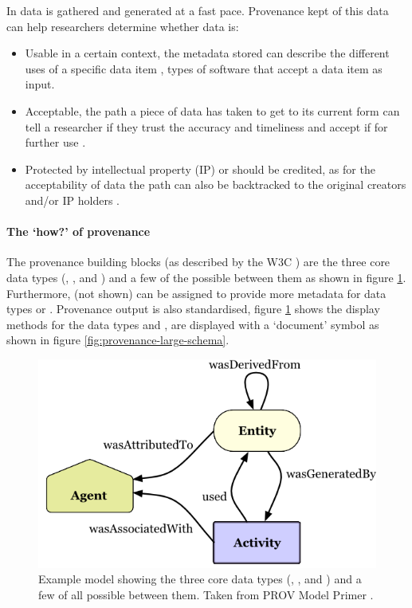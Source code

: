 In \escience{} data is gathered and generated at a fast pace.
Provenance kept of this data can help researchers determine whether data is:

\begin{itemize}
	\item Usable in a certain context, the metadata stored can describe the different uses of a specific data item \cite{dsp1simmhan}, \eg{} types of software that accept a data item as input.
	\item Acceptable, the path a piece of data has taken to get to its current form can tell a researcher if they trust the accuracy and timeliness and accept if for further use \cite{dsp1simmhan,dsp3buneman}.
	\item Protected by intellectual property (IP) or should be credited, as for the acceptability of data the path can also be backtracked to the original creators and/or IP holders \cite{dsp1simmhan}.
\end{itemize}

\paragraph{The `how?' of provenance}
\label{provenance-how}

The provenance building blocks (as described by the W3C \cite{dsp8gil}) are the three core data types (\agent{}, \entity{}, and \activity{}) and a few of the possible \relations{} between them as shown in figure \ref{fig:provenance-overview}.
Furthermore, \attributes{} (not shown) can be assigned to provide more metadata for data types or \relations{}.
Provenance output is also standardised, figure \ref{fig:provenance-overview} shows the display methods for the data types and \relations{}, \attributes{} are displayed with a `document' symbol as shown in figure \ref{fig:provenance-large-schema}.

\begin{figure}[h]
	\centering
	\includegraphics[width=0.5\linewidth]{images/provenance-overview}
	\caption{Example model showing the three core data types (\agent{}, \entity{}, and \activity{}) and a few of all possible \relations{} between them. 
		Taken from PROV Model Primer \cite{dsp8gil}.}
	\label{fig:provenance-overview}
\end{figure}

